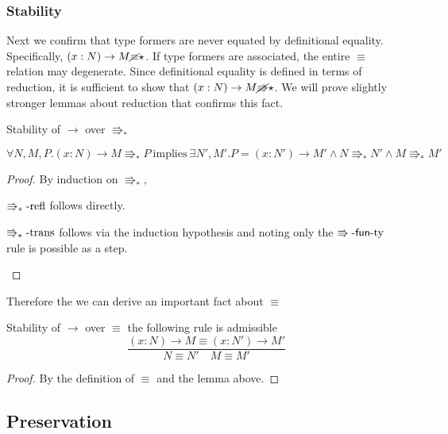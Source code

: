  
\subsubsection{Stability}
Next we confirm that type formers are never equated by definitional equality.
Specifically, $\left(x:N\right)\rightarrow M\cancel{\equiv}\star$.
If type formers are associated, the entire $\equiv$ relation may degenerate. %
Since definitional equality is defined in terms of reduction, it is sufficient to show that $\left(x:N\right)\rightarrow M\cancel{\Rrightarrow}\star$.
We will prove slightly stronger lemmas about reduction that confirms this fact.
 
\begin{lem}
Stability of $\rightarrow$ over $\Rrightarrow_{\ast}$
 
$\forall N,M,P.\left(x:N\right)\rightarrow M\Rrightarrow_{\ast}P\:\mathrm{implies}\:\exists N',M'.P=\left(x:N'\right)\rightarrow M'\land N\Rrightarrow_{\ast}N'\land M\Rrightarrow_{\ast}M'$
\end{lem}
 
\begin{proof}
By induction on $\Rrightarrow_{\ast}$,
\begin{casenv}
 \item $\operatorname{\Rrightarrow_{\ast}-refl}$ follows directly.
 \item $\operatorname{\Rrightarrow_{\ast}-trans}$ follows via the induction hypothesis and noting only the $\operatorname{\Rrightarrow-\mathsf{fun}-ty}$ rule is possible as a step.
\end{casenv}
\end{proof}
Therefore the we can derive an important fact about $\equiv$
\begin{cor}
Stability of $\rightarrow$ over $\equiv$
the following rule is admissible
\[
\frac{\left(x:N\right)\rightarrow M\equiv\left(x:N'\right)\rightarrow M'}{N\equiv N'\quad M\equiv M'}
\]
\end{cor}
 
\begin{proof}
By the definition of $\equiv$ and the lemma above.
\end{proof}
 
\subsection{Preservation}
 
